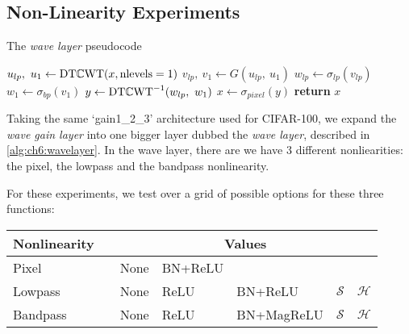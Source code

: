 \subsection{Non-Linearity Experiments}
\begin{algorithm}[t]
  \caption{The \emph{wave layer} pseudocode}\label{alg:ch6:wavelayer}
\begin{algorithmic}[1]
  \State $u_{lp},\ u_{1} \gets \mathrm{DT}\mathbb{C}\mathrm{WT}(x, \mbox{nlevels}=1) $ 
  \State $v_{lp},\ v_{1} \gets G(u_{lp},\ u_{1}) $ 
  \State $w_{lp} \gets \sigma_{lp}(v_{lp})$ 
  \State $w_{1} \gets \sigma_{bp}(v_{1})$ 
  \State $y \gets \mathrm{DT}\mathbb{C}\mathrm{WT}^{-1}(w_{lp},\ w_{1})$
  \State $x \gets \sigma_{pixel}(y)$ 
  \State \textbf{return} $x$
\EndProcedure
\end{algorithmic}
\end{algorithm}
Taking the same `gain1\_2\_3' architecture used for CIFAR-100, we expand the
\emph{wave gain layer} into one bigger layer
dubbed the \emph{wave layer}, described in \autoref{alg:ch6:wavelayer}. In the wave
layer, there are we have 3 different nonliearities: the pixel, the lowpass 
and the bandpass nonlinearity.

For these experiments, we test over a grid of possible options for these three
functions:
\begin{table}[h!]
  \centering
\begin{tabular}{l l l l l l l}
  \toprule
  Nonlinearity & \hphantom{abc} & \multicolumn{5}{c}{Values} \\
  \midrule
  Pixel && None & BN+ReLU \\
  Lowpass && None & ReLU & BN+ReLU & $\mathcal{S}$ & $\mathcal{H}$  \\
  Bandpass && None & ReLU & BN+MagReLU & $\mathcal{S}$ & $\mathcal{H}$ 
  \\\bottomrule
\end{tabular}
\end{table}

